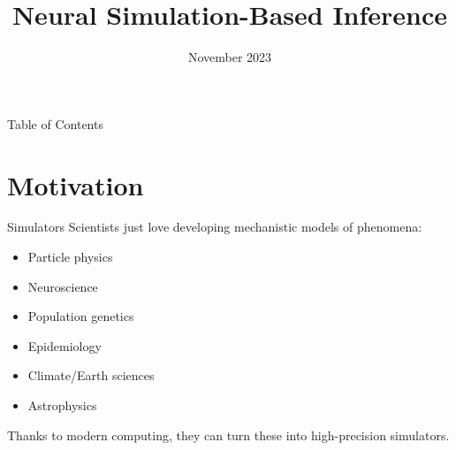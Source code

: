 \documentclass[12pt, aspectratio=169]{beamer}
\let\olditem\item
\renewcommand\item{\olditem\justifying}
\begin{document}
  
	\title{Neural Simulation-Based Inference}
	\date{November 2023}
 
\begin{frame}[plain]
    \vspace*{5pt}
    \vspace*{10pt}
    \maketitle
\end{frame}


\begin{frame}{Table of Contents}
    \tableofcontents
\end{frame}

\section{Motivation}
\begin{frame}{Simulators}
    Scientists just love developing mechanistic models of phenomena:
    \begin{itemize}[<+->]
        \item Particle physics
        \item Neuroscience
        \item Population genetics
        \item Epidemiology
        \item Climate/Earth sciences
        \item Astrophysics
    \end{itemize}

    \pause 
    Thanks to modern computing, they can turn these into high-precision simulators.
\end{frame}
\end{document}
